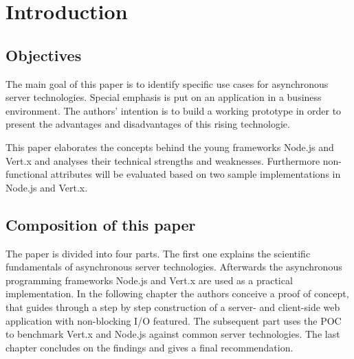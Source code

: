 \listoffigures
{}
\newpage

\lstlistoflistings
{}
\newpage

\renewcommand{\thepage}{\arabic{page}}

\setcounter{page}{1} 

\renewcommand{\baselinestretch}{1.4}\normalsize

\section{Introduction}

\subsection{Objectives}
The main goal of this paper is to identify specific use cases for asynchronous server
technologies. Special emphasis is put on an application in a business environment. 
The authors' intention is to build a working prototype in order to present the advantages and
disadvantages of this rising technologie.

This paper elaborates the concepts behind the young frameworks Node.js and Vert.x and analyses their 
technical strengths and weaknesses. Furthermore non-functional attributes will be
evaluated based on two sample implementations in Node.js  and Vert.x.

\subsection{Composition of this paper}
The paper is divided into four parts. The first one explains the scientific fundamentals of asynchronous server
technologies. Afterwards the asynchronous programming frameworks Node.js and Vert.x are used as a practical implementation.
In the following chapter the authors conceive a proof of concept, that guides through a step by step construction of a
server- and client-side web application with non-blocking I/O featured. The subsequent part uses the POC to benchmark Vert.x and Node.js against common server technologies. The last chapter concludes on the findings and gives a final recommendation.


